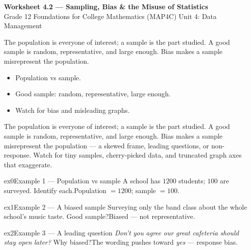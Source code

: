 \documentclass[11pt]{article}
\begin{document}
\begin{center}
{\LARGE\bfseries\color{titleblue}Worksheet 4.2 --- Sampling, Bias \& the Misuse of Statistics}\\[2pt]
{\small Grade 12 Foundations for College Mathematics (MAP4C) \textperiodcentered{} Unit 4: Data Management}
\end{center}

\begin{ideabox}
The population is everyone of interest; a sample is the part studied. A good sample is random, representative, and large enough. Bias makes a sample misrepresent the population.
\begin{itemize}[leftmargin=*,itemsep=2pt]
  \item Population vs sample.
  \item Good sample: random, representative, large enough.
  \item Watch for bias and misleading graphs.
\end{itemize}
\end{ideabox}

\begin{learnbox}
The population is everyone of interest; a sample is the part studied. A good sample is random, representative, and large enough.
Bias makes a sample misrepresent the population — a skewed frame, leading questions, or non-response.
Watch for tiny samples, cherry-picked data, and truncated graph axes that exaggerate.
\end{learnbox}


\begin{example}{ex0}{Example 1 --- Population vs sample}
A school has $1200$ students; $100$ are surveyed. Identify each.\soln Population $=1200$; sample $=100$.
\end{example}

\begin{example}{ex1}{Example 2 --- A biased sample}
Surveying only the band class about the whole school's music taste. Good sample?\soln Biased — not representative.
\end{example}

\begin{example}{ex2}{Example 3 --- A leading question}
\emph{Don't you agree our great cafeteria should stay open later?} Why biased?\soln The wording pushes toward \emph{yes} — response bias.
\end{example}
\end{document}
